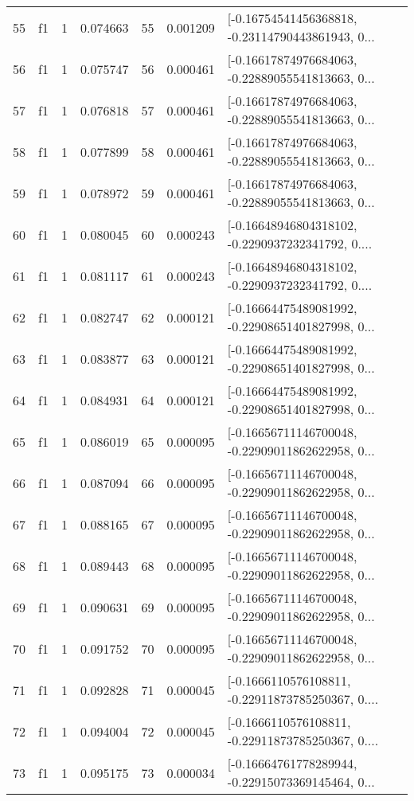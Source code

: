 \begin{tabular}{lllrlrl}
55  &  f1 &   1 &  0.074663 &   55 &  0.001209 &  [-0.16754541456368818, -0.23114790443861943, 0... \\
56  &  f1 &   1 &  0.075747 &   56 &  0.000461 &  [-0.16617874976684063, -0.22889055541813663, 0... \\
57  &  f1 &   1 &  0.076818 &   57 &  0.000461 &  [-0.16617874976684063, -0.22889055541813663, 0... \\
58  &  f1 &   1 &  0.077899 &   58 &  0.000461 &  [-0.16617874976684063, -0.22889055541813663, 0... \\
59  &  f1 &   1 &  0.078972 &   59 &  0.000461 &  [-0.16617874976684063, -0.22889055541813663, 0... \\
60  &  f1 &   1 &  0.080045 &   60 &  0.000243 &  [-0.16648946804318102, -0.2290937232341792, 0.... \\
61  &  f1 &   1 &  0.081117 &   61 &  0.000243 &  [-0.16648946804318102, -0.2290937232341792, 0.... \\
62  &  f1 &   1 &  0.082747 &   62 &  0.000121 &  [-0.16664475489081992, -0.22908651401827998, 0... \\
63  &  f1 &   1 &  0.083877 &   63 &  0.000121 &  [-0.16664475489081992, -0.22908651401827998, 0... \\
64  &  f1 &   1 &  0.084931 &   64 &  0.000121 &  [-0.16664475489081992, -0.22908651401827998, 0... \\
65  &  f1 &   1 &  0.086019 &   65 &  0.000095 &  [-0.16656711146700048, -0.22909011862622958, 0... \\
66  &  f1 &   1 &  0.087094 &   66 &  0.000095 &  [-0.16656711146700048, -0.22909011862622958, 0... \\
67  &  f1 &   1 &  0.088165 &   67 &  0.000095 &  [-0.16656711146700048, -0.22909011862622958, 0... \\
68  &  f1 &   1 &  0.089443 &   68 &  0.000095 &  [-0.16656711146700048, -0.22909011862622958, 0... \\
69  &  f1 &   1 &  0.090631 &   69 &  0.000095 &  [-0.16656711146700048, -0.22909011862622958, 0... \\
70  &  f1 &   1 &  0.091752 &   70 &  0.000095 &  [-0.16656711146700048, -0.22909011862622958, 0... \\
71  &  f1 &   1 &  0.092828 &   71 &  0.000045 &  [-0.1666110576108811, -0.22911873785250367, 0.... \\
72  &  f1 &   1 &  0.094004 &   72 &  0.000045 &  [-0.1666110576108811, -0.22911873785250367, 0.... \\
73  &  f1 &   1 &  0.095175 &   73 &  0.000034 &  [-0.16664761778289944, -0.22915073369145464, 0... \\

\end{tabular}
